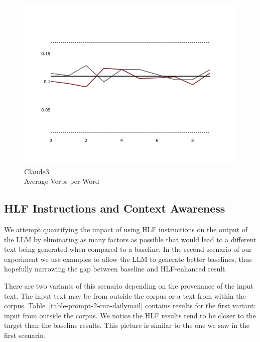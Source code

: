 \documentclass[11pt]{article}
\begin{document}
\begin{figure}[ht!]
\begin{minipage}{0.32\textwidth}
    \end{minipage}
    \hfill
    \begin{minipage}{0.32\textwidth}
        \includegraphics[width=\linewidth]{plots/prompt_1/prompt_1-claude3-cnn_dailymail/prompt_1-claude3-cnn_dailymail_a_verb_pw.png}
        \caption[center]{Claude3\\Average Verbs per Word}\label{fig-llama-simp-ttr}
    \end{minipage}
\end{figure}

\subsection{HLF Instructions and Context Awareness}

We attempt quantifying the impact of using HLF instructions on the output of the
LLM by eliminating as many factors as possible that would lead to a different
text being generated when compared to a baseline.
In the second scenario of our experiment we use examples to allow the LLM to
generate better baselines, thus hopefully narrowing the gap between baseline
and HLF-enhanced result.

There are two variants of this scenario depending on the provenance of the input
text.
The input text may be from outside the corpus or a text from within the corpus.
Table~\ref{table-prompt-2-cnn-dailymail} contains results for the first variant:
input from outside the corpus.
We notice the HLF results tend to be closer to the target than the baseline
results.
This picture is similar to the one we saw in the first scenario.
\end{document}
